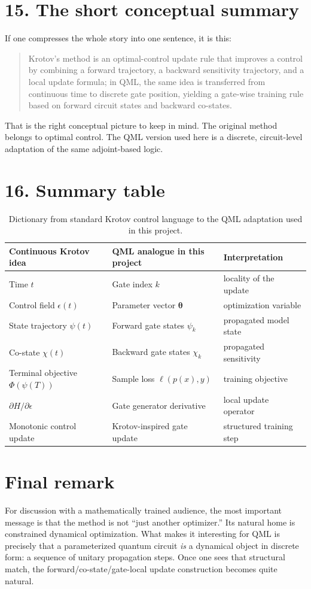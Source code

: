 \documentclass[11pt]{article}
\begin{document}
\section*{15. The short conceptual summary}
If one compresses the whole story into one sentence, it is this:

\begin{quote}
Krotov's method is an optimal-control update rule that improves a control by combining a forward trajectory, a backward sensitivity trajectory, and a local update formula; in QML, the same idea is transferred from continuous time to discrete gate position, yielding a gate-wise training rule based on forward circuit states and backward co-states.
\end{quote}

That is the right conceptual picture to keep in mind. The original method belongs to optimal control. The QML version used here is a discrete, circuit-level adaptation of the same adjoint-based logic.

\section*{16. Summary table}
\begin{table}[h]
\centering
\begin{tabular}{@{}lll@{}}
\toprule
Continuous Krotov idea & QML analogue in this project & Interpretation \\
\midrule
Time $t$ & Gate index $k$ & locality of the update \\
Control field $\epsilon(t)$ & Parameter vector $\bm{\theta}$ & optimization variable \\
State trajectory $\psi(t)$ & Forward gate states $\psi_k$ & propagated model state \\
Co-state $\chi(t)$ & Backward gate states $\chi_k$ & propagated sensitivity \\
Terminal objective $\Phi(\psi(T))$ & Sample loss $\ell(p(x),y)$ & training objective \\
$\partial H/\partial \epsilon$ & Gate generator derivative & local update operator \\
Monotonic control update & Krotov-inspired gate update & structured training step \\
\bottomrule
\end{tabular}
\caption{Dictionary from standard Krotov control language to the QML adaptation used in this project.}
\end{table}

\section*{Final remark}
For discussion with a mathematically trained audience, the most important message is that the method is not ``just another optimizer.'' Its natural home is constrained dynamical optimization. What makes it interesting for QML is precisely that a parameterized quantum circuit \emph{is} a dynamical object in discrete form: a sequence of unitary propagation steps. Once one sees that structural match, the forward/co-state/gate-local update construction becomes quite natural.
\end{document}
